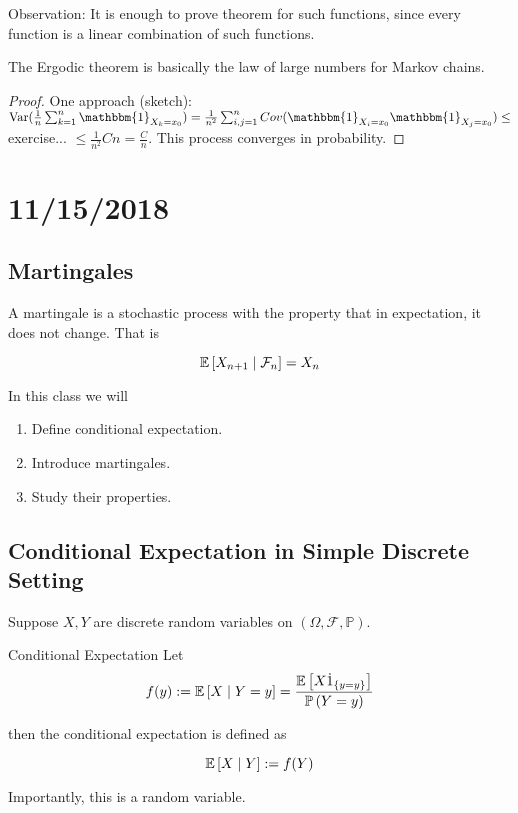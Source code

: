 \documentclass[english, course]{Notes}
\begin{document}
Observation: It is enough to prove theorem for such functions, since every function is a linear combination of such functions.\\

\begin{remark}
	The Ergodic theorem is basically the law of large numbers for Markov chains.
\end{remark}

\begin{proof}
	One approach (sketch):\\
	$\Var(\frac{1}{n} \sum_{k=1}^n \mathbbm{1}_{X_k = x_0}) = \frac{1}{n^2} \sum_{i, j = 1}^n Cov(\mathbbm{1}_{X_i = x_0} \mathbbm{1}_{X_j = x_0}) \leq$ exercise... $\leq \frac{1}{n^2} C n = \frac{C}{n}$. This process converges in probability.
\end{proof}

\section{11/15/2018}

\subsection{Martingales}

\begin{definition}[Martingales]
	A martingale is a stochastic process with the property that in expectation, it does not change. That is
	
	\[\mathbb{E}\left[X_{n + 1} \mid \mathcal{F}_n\right] = X_n\]
\end{definition}

In this class we will

\begin{enumerate}
	\item Define conditional expectation.
	\item Introduce martingales.
	\item Study their properties.
\end{enumerate}

\subsection{Conditional Expectation in Simple Discrete Setting}

Suppose $X, Y$ are discrete random variables on $(\Omega, \mathcal{F}, \mathbb{P})$.

\begin{definition}{Conditional Expectation}
	Let
	\[f(y) := \mathbb{E}\left[X \mid Y = y\right] = \frac{\mathbb{E}\left[X \dot 1_{\{y = y\}}\right]}{\mathbb{P}\left(Y = y\right)}\]
	
	then the conditional expectation is defined as
	
	\[\mathbb{E}\left[X \mid Y\right] :=  f(Y)\]
	
	Importantly, this is a random variable.
\end{definition}
\end{document}
